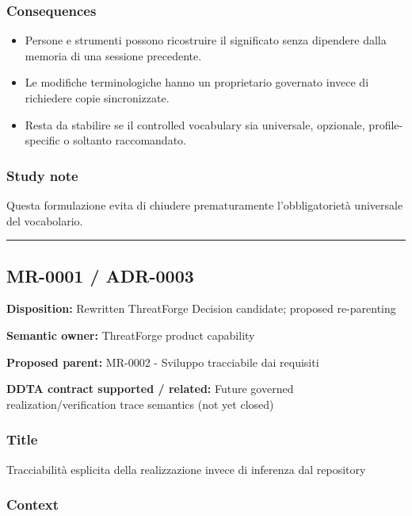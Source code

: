 \documentclass[
  10pt,
  a4paper,
]{article}
\providecommand{\tightlist}{%
  \setlength{\itemsep}{0pt}\setlength{\parskip}{0pt}}
\begin{document}
\subsubsection{Consequences}\label{consequences-1}

\begin{itemize}
\tightlist
\item
  Persone e strumenti possono ricostruire il significato senza dipendere
  dalla memoria di una sessione precedente.
\item
  Le modifiche terminologiche hanno un proprietario governato invece di
  richiedere copie sincronizzate.
\item
  Resta da stabilire se il controlled vocabulary sia universale,
  opzionale, profile-specific o soltanto raccomandato.
\end{itemize}

\subsubsection{Study note}\label{study-note-1}

Questa formulazione evita di chiudere prematuramente l'obbligatorietà
universale del vocabolario.

\begin{center}\rule{0.5\linewidth}{0.5pt}\end{center}

\subsection{MR-0001 / ADR-0003}\label{mr-0001-adr-0003}

\textbf{Disposition:} Rewritten ThreatForge Decision candidate; proposed
re-parenting

\textbf{Semantic owner:} ThreatForge product capability

\textbf{Proposed parent:} MR-0002 - Sviluppo tracciabile dai requisiti

\textbf{DDTA contract supported / related:} Future governed
realization/verification trace semantics (not yet closed)

\subsubsection{Title}\label{title-2}

Tracciabilità esplicita della realizzazione invece di inferenza dal
repository

\subsubsection{Context}\label{context-2}
\end{document}
